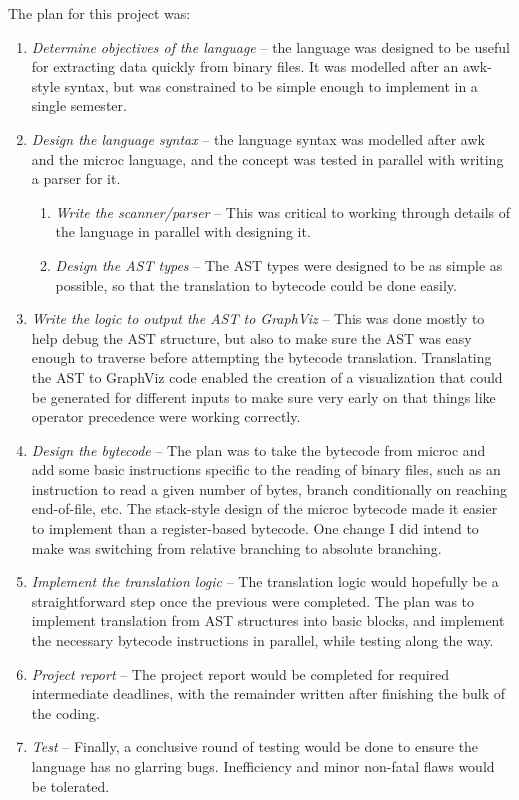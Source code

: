 The plan for this project was:

\begin{enumerate}
\item \textsl{Determine objectives of the language} -- the language was designed to be useful for extracting data quickly from binary files.  It was modelled after an awk-style syntax, but was constrained to be simple enough to implement in a single semester.

\item \textsl{Design the language syntax} -- the language syntax was modelled after awk and the microc language, and the concept was tested in parallel with writing a parser for it.
\begin{enumerate}
	\item \textsl{Write the scanner/parser} -- This was critical to working through details of the language in parallel with designing it.
	\item \textsl{Design the AST types} -- The AST types were designed to be as simple as possible, so that the translation to bytecode could be done easily.
\end{enumerate}

\item \textsl{Write the logic to output the AST to GraphViz} -- This was done mostly to help debug the AST structure, but also to make sure the AST was easy enough to traverse before attempting the bytecode translation.  Translating the AST to GraphViz code enabled the creation of a visualization that could be generated for different inputs to make sure very early on that things like operator precedence were working correctly.

\item \textsl{Design the bytecode} -- The plan was to take the bytecode from microc and add some basic instructions specific to the reading of binary files, such as an instruction to read a given number of bytes, branch conditionally on reaching end-of-file, etc.  The stack-style design of the microc bytecode made it easier to implement than a register-based bytecode.  One change I did intend to make was switching from relative branching to absolute branching.

\item \textsl{Implement the translation logic} -- The translation logic would hopefully be a straightforward step once the previous were completed.  The plan was to implement translation from AST structures into basic blocks, and implement the necessary bytecode instructions in parallel, while testing along the way.

\item \textsl{Project report} -- The project report would be completed for required intermediate deadlines, with the remainder written after finishing the bulk of the coding.

\item \textsl{Test} -- Finally, a conclusive round of testing would be done to ensure the language has no glarring bugs.  Inefficiency and minor non-fatal flaws would be tolerated.
\end{enumerate}